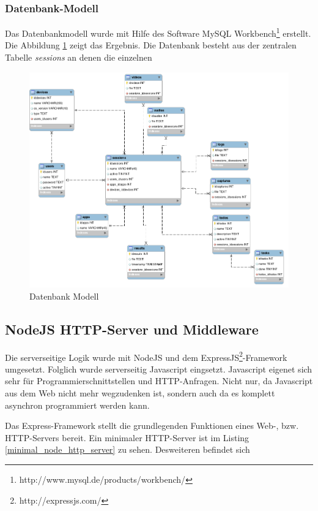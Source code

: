 \subsubsection{Datenbank-Modell}
Das Datenbankmodell wurde mit Hilfe des Software MySQL Workbench\footnote{http://www.mysql.de/products/workbench/} erstellt. Die Abbildung \ref{figure-db-model} zeigt das Ergebnis. Die Datenbank besteht aus der zentralen Tabelle \textit{sessions} an denen die einzelnen 
\begin{figure}[h!]
	\centering
	\includegraphics[width=\linewidth,keepaspectratio]{img/db_model.png}
	\caption{Datenbank Modell}
	\label{figure-db-model}
\end{figure}


\subsection{NodeJS HTTP-Server und Middleware}
Die serverseitige Logik wurde mit NodeJS und dem ExpressJS\footnote{http://expressjs.com/}-Framework umgesetzt. Folglich wurde serverseitig Javascript eingsetzt. Javascript eigenet sich sehr für Programmierschnittstellen und HTTP-Anfragen. Nicht nur, da Javascript aus dem Web nicht mehr wegzudenken ist, sondern auch da es komplett asynchron programmiert werden kann. 

Das Express-Framework stellt die grundlegenden Funktionen eines Web-, bzw. HTTP-Servers bereit. Ein minimaler HTTP-Server ist im Listing \ref{minimal_node_http_server} zu sehen. Desweiteren befindet sich 

